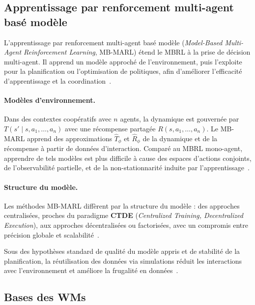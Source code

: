 \documentclass[final]{jfsma}
\theoremstyle{plain}
\theoremstyle{definition}
\theoremstyle{remark}
\begin{document}
\subsection{Apprentissage par renforcement multi-agent basé modèle}
\label{sec:mb-marl}

L'apprentissage par renforcement multi-agent basé modèle (\emph{Model-Based Multi-Agent Reinforcement Learning}, MB-MARL) étend le MBRL à la prise de décision multi-agent. Il apprend un modèle approché de l'environnement, puis l'exploite pour la planification ou l'optimisation de politiques, afin d'améliorer l'efficacité d'apprentissage et la coordination~\cite{Moerland2023modelbased,Wang2022modelbasedmultiagentreinforcementlearning}.

\paragraph{Modèles d'environnement.}
Dans des contextes coopératifs avec $n$ agents, la dynamique est gouvernée par
$T(s' \mid s, a_1,\dots,a_n)$ avec une récompense partagée $R(s,a_1,\dots,a_n)$.
Le MB-MARL apprend des approximations
$\hat{T}_\phi$ et $\hat{R}_\phi$ de la dynamique et de la récompense à partir de données d'interaction.
Comparé au MBRL mono-agent, apprendre de tels modèles est plus difficile
à cause des espaces d'actions conjoints, de l'observabilité partielle, et de la non-stationnarité induite par l'apprentissage~\cite{Wang2022modelbasedmultiagentreinforcementlearning}.

\paragraph{Structure du modèle.}
Les méthodes MB-MARL diffèrent par la structure du modèle : des approches centralisées, proches du paradigme \textbf{CTDE} (\emph{Centralized Training, Decentralized Execution}), aux approches décentralisées ou factorisées, avec un compromis entre précision globale et scalabilité~\cite{Wang2022modelbasedmultiagentreinforcementlearning}.

Sous des hypothèses standard de qualité du modèle appris et de stabilité de la planification, la réutilisation des données via simulations réduit les interactions avec l'environnement et améliore la frugalité en données~\cite{Wang2022modelbasedmultiagentreinforcementlearning,Moerland2023modelbased}.

\subsection{Bases des WMs}
\label{sec:wm_basics}
\end{document}
